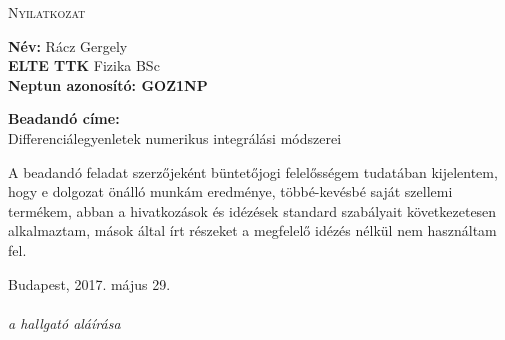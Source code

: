 \newpage
\thispagestyle{empty}
\begin{center}
\Large{ \textsc{Nyilatkozat} }
\end{center}

\vspace*{1cm}
\noindent \textbf{Név:} Rácz Gergely\\
\textbf{ELTE TTK} Fizika BSc \\
\textbf{Neptun azonosító: GOZ1NP} 

\vspace*{0.5cm}
\noindent \textbf{Beadandó címe:} \\
Differenciálegyenletek numerikus integrálási módszerei

\vspace*{2.5cm}
A beadandó feladat szerzőjeként büntetőjogi felelősségem tudatában kijelentem, hogy e dolgozat önálló munkám eredménye, többé-kevésbé saját szellemi termékem, abban a hivatkozások és idézések standard szabályait következetesen alkalmaztam, mások által írt részeket a megfelelő idézés nélkül nem használtam fel.

\vspace*{4.5cm}
\noindent Budapest, 2017. május 29. \\
\hspace*{10.0cm}{.............................................}\\[2ex]
\hspace*{11cm}\emph{a hallgató aláírása}
